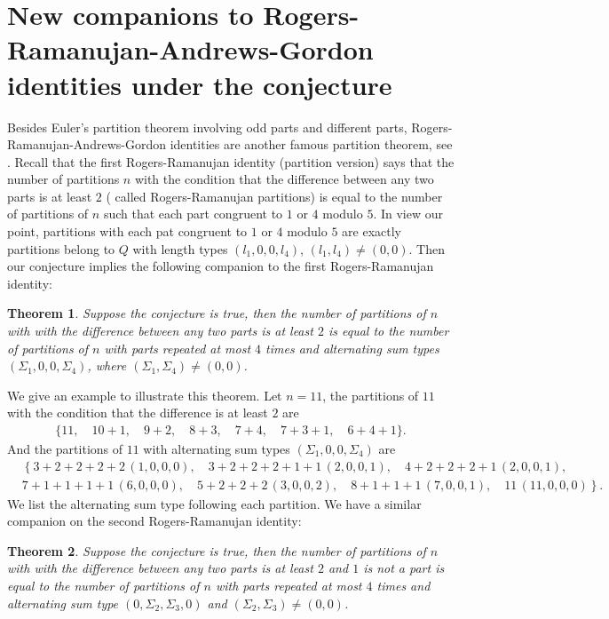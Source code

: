 \documentclass[draft]{amsart}
\numberwithin{equation}{section}
\theoremstyle{plain}
\newtheorem{theorem}{Theorem}[section]
\theoremstyle{remark}
\begin{document}
\section{New companions to Rogers-Ramanujan-Andrews-Gordon identities under the conjecture}
Besides Euler's partition theorem involving odd parts and different parts, Rogers-Ramanujan-Andrews-Gordon identities are another famous partition theorem, see \cite{AlladiBerkovich2, AndrewsRR, Ber-peter, Bressoud, Rogers}. Recall that the first Rogers-Ramanujan identity (partition version) says that the number of partitions $n$ with the condition that the difference between any two parts is at least $2$ ( called Rogers-Ramanujan partitions) is equal to the number of partitions of $n$ such that each part congruent to $1$ or $4$ modulo $5$. In view our point,  partitions with each pat congruent to $1$ or $4$ modulo $5$ are exactly partitions belong to $Q$ with length types $(l_{1},0, 0, l_{4})$, $(l_{1},l_{4})\neq (0,0)$. Then our conjecture implies the following companion to the first Rogers-Ramanujan identity:
\begin{theorem}
Suppose the conjecture is true, then the number of partitions of $n$ with with the difference between any two parts is at least
$2$ is equal to the number of partitions of $n$ with parts repeated  at most $4$ times and alternating sum types $(\Sigma_{1},0,0,\Sigma_{4})$,  where $(\Sigma_{1}, \Sigma_{4})\neq (0,0)$.
\end{theorem}
We give an example to illustrate this theorem. Let $n=11$, the partitions of $11$ with the condition that the difference is at least
$2$ are
\begin{align*}
\{11,\quad 10+1,\quad 9+2,\quad 8+3, \quad
7+4, \quad 7+3+1,\quad 6+4+1 \}.
\end{align*}
And the partitions of $11$ with alternating sum types $(\Sigma_{1},0,0,\Sigma_{4})$ are 
\begin{align*}
&\left\{3+2+2+2+2\,(1,0,0,0),\quad 3+2+2+2+1+1\,(2,0,0,1),\quad 4+2+2+2+1\,(2,0,0,1),\right.\\
&\left. 7+1+1+1+1\,(6,0,0,0),\quad    5+2+2+2\,(3,0,0,2),\quad 8+1+1+1\,(7,0,0,1),  \quad 11\,(11,0,0,0)\right\}.
\end{align*}
We list the alternating sum type following each partition.
We have a similar companion on the second Rogers-Ramanujan identity:
\begin{theorem}
Suppose the conjecture is true, then the number of partitions of $n$ with with the difference between any two parts is at least
$2$ and $1$ is not a part is equal to the number of partitions of $n$ with parts repeated  at most $4$ times and alternating sum type $(0,\Sigma_{2},\Sigma_{3},0)$ and $(\Sigma_{2}, \Sigma_{3})\neq (0,0)$.
\end{theorem}
\end{document}

